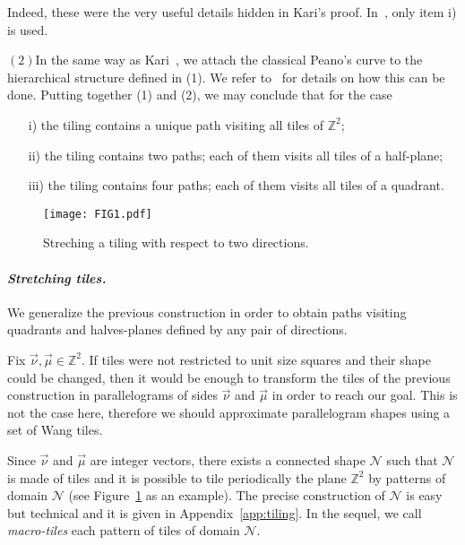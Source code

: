\documentclass{llncs}
\newcommand{\z}{\ensuremath{\mathbb{Z}}\xspace}
\newcommand{\nn}{\vec\nu}
\newcommand{\mm}{\vec \mu}
\newcommand{\ignore}[1]{}
\begin{document}
Indeed, these were the very useful details hidden in Kari's proof.
In~\cite{kari94a}, only item i) is used.
\medskip

\par\noindent$(2)$\quad In the same way as Kari~\cite{kari94a}, we attach the classical Peano's curve \ignore{(Figure~\ref{ROB2})} to the hierarchical
structure defined in (1). We refer to~\cite{kari94a} for details on
how this can be done. Putting together (1) and (2), we may conclude
that for the case
\begin{enumerate}
\item[i)] the tiling contains a unique path visiting all tiles of $\z^2$; 
\item[ii)] the tiling contains two paths; each of them visits all tiles
of a half-plane;
\item[iii)] the tiling contains four paths; each of them visits all tiles of a quadrant. 
\end{enumerate}
 
\begin{figure}[t]
\begin{center}
\texttt{[image: FIG1.pdf]}
\caption{Streching a tiling with respect to two directions.}
\label{fig:stretching-tiles}
\end{center}
\end{figure}



\paragraph{\emph{Stretching tiles.}}  We generalize the previous
construction in order to obtain paths visiting quadrants and halves-planes defined by any pair of directions.

Fix $\nn,\mm\in\z^2$. If tiles were not restricted to unit size squares and their shape could be changed, 
then it would be enough to transform
the tiles of the previous construction in parallelograms of sides $\nn$ and $\mm$ in order to reach our goal. This is not the case here,
therefore we should approximate parallelogram shapes
using a set of Wang tiles. 



Since $\nn$ and $\mm$ are integer vectors, there exists a 
connected shape  $\mathcal{N}$ such that $\mathcal{N}$ is made of tiles and it is possible to tile periodically the plane $\z^2$ by
patterns of domain $\mathcal{N}$
(see Figure~\ref{fig:stretching-tiles} as an example). 
The precise construction of $\mathcal{N}$ is easy but technical and
it is given in Appendix~\ref{app:tiling}. In the sequel, 
we call \emph{macro-tiles} each pattern of tiles of domain 
$\mathcal{N}$.
\end{document}
